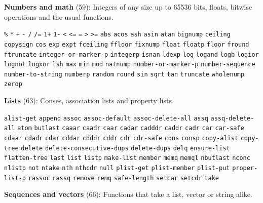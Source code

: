 \documentclass[11pt]{article}
\begin{document}
\textbf{Numbers and math} (59): Integers of any size up to 65536 bits, floats, bitwise operations and the usual functions.

\texttt{\%} \texttt{*} \texttt{+} \texttt{-} \texttt{/} \texttt{/=} \texttt{1+} \texttt{1-} \texttt{<} \texttt{<=} \texttt{=} \texttt{>} \texttt{>=} \texttt{abs} \texttt{acos} \texttt{ash} \texttt{asin} \texttt{atan} \texttt{bignump} \texttt{ceiling} \texttt{copysign} \texttt{cos} \texttt{exp} \texttt{expt} \texttt{fceiling} \texttt{ffloor} \texttt{fixnump} \texttt{float} \texttt{floatp} \texttt{floor} \texttt{fround} \texttt{ftruncate} \texttt{integer-or-marker-p} \texttt{integerp} \texttt{isnan} \texttt{ldexp} \texttt{log} \texttt{logand} \texttt{logb} \texttt{logior} \texttt{lognot} \texttt{logxor} \texttt{lsh} \texttt{max} \texttt{min} \texttt{mod} \texttt{natnump} \texttt{number-or-marker-p} \texttt{number-sequence} \texttt{number-to-string} \texttt{numberp} \texttt{random} \texttt{round} \texttt{sin} \texttt{sqrt} \texttt{tan} \texttt{truncate} \texttt{wholenump} \texttt{zerop}

\textbf{Lists} (63): Conses, association lists and property lists.

\texttt{alist-get} \texttt{append} \texttt{assoc} \texttt{assoc-default} \texttt{assoc-delete-all} \texttt{assq} \texttt{assq-delete-all} \texttt{atom} \texttt{butlast} \texttt{caaar} \texttt{caadr} \texttt{caar} \texttt{cadar} \texttt{cadddr} \texttt{caddr} \texttt{cadr} \texttt{car} \texttt{car-safe} \texttt{cdaar} \texttt{cdadr} \texttt{cdar} \texttt{cddar} \texttt{cdddr} \texttt{cddr} \texttt{cdr} \texttt{cdr-safe} \texttt{cons} \texttt{consp} \texttt{copy-alist} \texttt{copy-tree} \texttt{delete} \texttt{delete-consecutive-dups} \texttt{delete-dups} \texttt{delq} \texttt{ensure-list} \texttt{flatten-tree} \texttt{last} \texttt{list} \texttt{listp} \texttt{make-list} \texttt{member} \texttt{memq} \texttt{memql} \texttt{nbutlast} \texttt{nconc} \texttt{nlistp} \texttt{not} \texttt{ntake} \texttt{nth} \texttt{nthcdr} \texttt{null} \texttt{plist-get} \texttt{plist-member} \texttt{plist-put} \texttt{proper-list-p} \texttt{rassoc} \texttt{rassq} \texttt{remove} \texttt{remq} \texttt{safe-length} \texttt{setcar} \texttt{setcdr} \texttt{take}

\textbf{Sequences and vectors} (66): Functions that take a list, vector or string alike.
\end{document}
